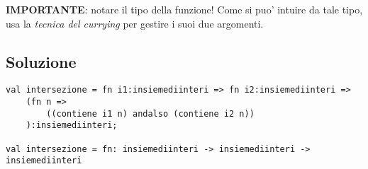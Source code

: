 \textbf{IMPORTANTE}: notare il tipo della funzione! Come si puo' intuire da tale tipo, usa la \emph{tecnica del currying} per gestire i suoi due argomenti.

\subsection{Soluzione}

\begin{lstlisting}[style = SML, caption = {Definizione della funzione \sml{intersezione}}]
val intersezione = fn i1:insiemediinteri => fn i2:insiemediinteri =>
	(fn n =>
		((contiene i1 n) andalso (contiene i2 n))
	):insiemediinteri;

val intersezione = fn: insiemediinteri -> insiemediinteri -> insiemediinteri
\end{lstlisting}
